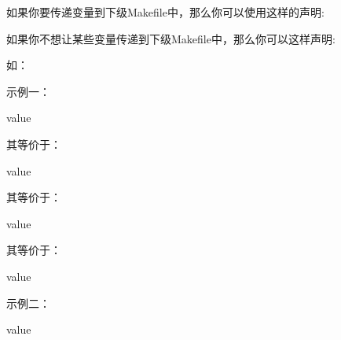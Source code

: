 \documentclass[a4paper,10pt]{sphinxmanual}
\begin{document}
如果你要传递变量到下级Makefile中，那么你可以使用这样的声明:

\begin{sphinxVerbatim}[commandchars=\\\{\}]
  
\end{sphinxVerbatim}

如果你不想让某些变量传递到下级Makefile中，那么你可以这样声明:

\begin{sphinxVerbatim}[commandchars=\\\{\}]
  
\end{sphinxVerbatim}

如：

示例一：

\begin{sphinxVerbatim}[commandchars=\\\{\}]
  value
\end{sphinxVerbatim}

其等价于：

\begin{sphinxVerbatim}[commandchars=\\\{\}]
  value
 
\end{sphinxVerbatim}

其等价于：

\begin{sphinxVerbatim}[commandchars=\\\{\}]
  value
\end{sphinxVerbatim}

其等价于：

\begin{sphinxVerbatim}[commandchars=\\\{\}]
  value
 
\end{sphinxVerbatim}

示例二：

\begin{sphinxVerbatim}[commandchars=\\\{\}]
  value
\end{sphinxVerbatim}
\end{document}
